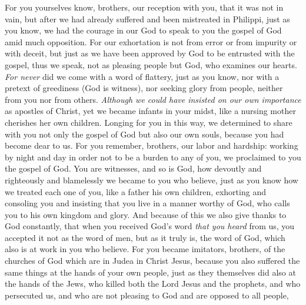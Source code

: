 \begin{biblechapter} %
 For you yourselves know, brothers, our reception with you, that it was not in vain,
\verse but after we had already suffered and been mistreated in Philippi, just as you know, we had the courage in our God to speak to you the gospel of God amid much opposition.
\verse For our exhortation is not from error or from impurity or with deceit,
\verse but just as we have been approved by God to be entrusted with the gospel, thus we speak, not as pleasing people but God, who examines our hearts.
\verse \textit{For never} did we come with a word of flattery, just as you know, nor with a pretext of greediness (God is witness),
\verse nor seeking glory from people, neither from you nor from others.
\verse \textit{Although we could have insisted on our own importance} as apostles of Christ, yet we became infants in your midst, like a nursing mother cherishes her own children.
\verse Longing for you in this way, we determined to share with you not only the gospel of God but also our own souls, because you had become dear to us.
\verse For you remember, brothers, our labor and hardship: working by night and day in order not to be a burden to any of you, we proclaimed to you the gospel of God.
\verse You are witnesses, and so is God, how devoutly and righteously and blamelessly we became to you who believe,
\verse just as you know how we treated each one of you, like a father his own children,
\verse exhorting and consoling you and insisting that you live in a manner worthy of God, who calls you to his own kingdom and glory.
 And because of this we also give thanks to God constantly, that when you received God’s word \textit{that you heard} from us, you accepted it not as the word of men, but as it truly is, the word of God, which also is at work in you who believe.
\verse For you became imitators, brothers, of the churches of God which are in Judea in Christ Jesus, because you also suffered the same things at the hands of your own people, just as they themselves did also at the hands of the Jews,
\verse who killed both the Lord Jesus and the prophets, and who persecuted us, and who are not pleasing to God and are opposed to all people,

\end{biblechapter}
